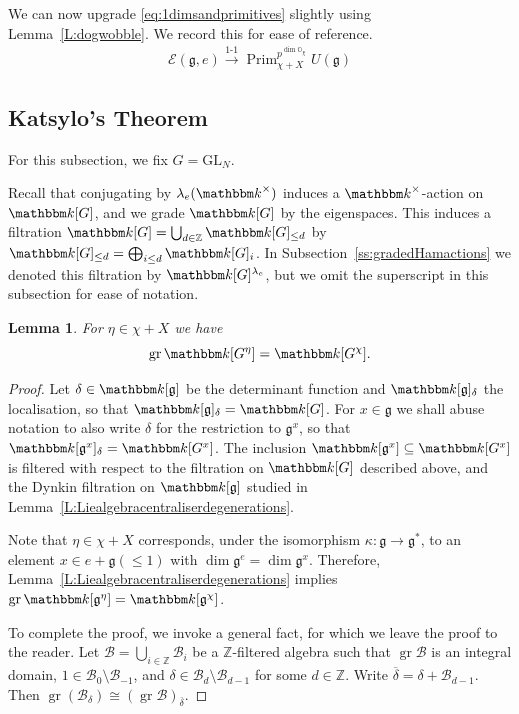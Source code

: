 \documentclass[twoside,12pt,reqno]{amsart}
\newtheorem{Lemma}[Theorem]{Lemma}
\theoremstyle{remark}
\numberwithin{equation}{section}
\def\bar{\overline}
\def\k{{\mathbbm k}}
\def\gr{\operatorname{gr}}
\def\Prim{\operatorname{Prim}}
\def\Z{{\mathbb Z}}
\def\O{{\mathbb O}}
\def\GL{\mathrm{GL}}
\def\g{{\mathfrak g}}
\def\E{\mathcal{E}}
\def\B{\mathcal{B}}
\begin{document}
We can now upgrade \eqref{eq:1dimsandprimitives} slightly using Lemma~\ref{L:dogwobble}. We record this for ease of reference.
\begin{eqnarray}
\label{eq:1dimsandprimitives2}
\E(\g,e) \overset{1\text{-}1}{\longrightarrow }\Prim_{\chi+X}^{p^{\dim \O_\chi}} U(\g)
\end{eqnarray} 


\subsection{Katsylo's Theorem}
\label{ss:Katsylosection}
For this subsection, we fix $G=\GL_N$.

Recall that conjugating by $\lambda_e(\k^\times)$ induces a $\k^\times$-action on $\k[G]$, and we grade $\k[G]$ by the eigenspaces. This induces a filtration $\k[G] = \bigcup_{d\in \Z} \k[G]_{\le d}$ by $\k[G]_{\le d} = \bigoplus_{i\le d} \k[G]_i$. In Subsection~\ref{ss:gradedHamactions} we denoted this filtration by $\k[G]^{\lambda_e}$, but we omit the superscript in this subsection for ease of notation.
\begin{Lemma}
\label{L:coneisGchi}
    For $\eta \in \chi + X$ we have $$\gr \k[G^\eta] = \k[G^\chi].$$
\end{Lemma}
\begin{proof}
    Let $\delta\in \k[\g]$ be the determinant function and $\k[\g]_\delta$ the localisation, so that $\k[\g]_\delta = \k[G]$. For $x\in \g$ we shall abuse notation to also write $\delta$ for the restriction to $\g^x$, so that $\k[\g^x]_\delta = \k[G^x]$. The inclusion $\k[\g^x] \subseteq \k[G^x]$ is filtered with respect to the filtration on $\k[G]$ described above, and the Dynkin filtration on $\k[\g]$ studied in Lemma~\ref{L:Liealgebracentraliserdegenerations}.

    Note that $\eta \in \chi + X$ corresponds, under the isomorphism $\kappa : \g \to \g^*$, to an element $x\in e + \g(\le 1)$ with $\dim \g^e = \dim \g^x$. Therefore, Lemma~\ref{L:Liealgebracentraliserdegenerations} implies $\gr \k[\g^\eta] = \k[\g^\chi]$.

    To complete the proof, we invoke a general fact, for which we leave the proof to the reader. Let $\B = \bigcup_{i\in \Z} \B_i$ be a $\Z$-filtered algebra such that $\gr \B$ is an integral domain, $1\in \B_0 \setminus \B_{-1}$, and $\delta \in \B_d\setminus \B_{d-1}$ for some $d \in \Z$. Write $\bar \delta = \delta + \B_{d-1}$. Then $\gr(\B_\delta) \cong (\gr \B)_{\bar \delta}$.
\end{proof}
\end{document}
